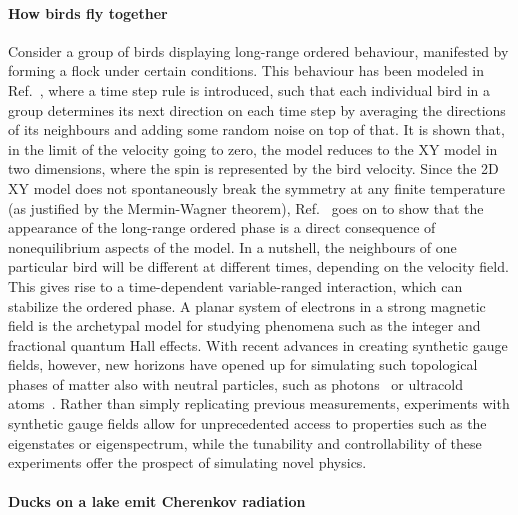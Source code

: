 \paragraph{How birds fly together}
Consider a group of birds displaying long-range ordered behaviour,
manifested by forming a flock under certain conditions. This behaviour
has been modeled in Ref.~\cite{Toner1995}, where a time step rule is
introduced, such that each individual bird in a group determines its
next direction on each time step by averaging the directions of its
neighbours and adding some random noise on top of that. It is shown
that, in the limit of the velocity going to zero, the model reduces to
the XY model in two dimensions, where the spin is represented by the
bird velocity. Since the 2D XY model does not spontaneously break the
symmetry at any finite temperature (as justified by the Mermin-Wagner
theorem), Ref.~\cite{Toner1995} goes on to show that the appearance of
the long-range ordered phase is a direct consequence of nonequilibrium
aspects of the model. In a nutshell, the neighbours of one particular
bird will be different at different times, depending on the velocity
field. This gives rise to a time-dependent variable-ranged
interaction, which can stabilize the ordered phase.
%
A planar system of electrons in a strong magnetic field is the
archetypal model for studying phenomena such as the integer and
fractional quantum Hall effects. With recent advances in creating
synthetic gauge fields, however, new horizons have opened up for
simulating such topological phases of matter also with neutral
particles, such as photons~\cite{hafezi2014synthetic} or ultracold
atoms~\cite{dalibardrmp2011, goldman_repprog_2014,
Goldman_arxiv_2015}.  Rather than simply replicating previous
measurements, experiments with synthetic gauge fields allow for
unprecedented access to properties such as the eigenstates or
eigenspectrum, while the tunability and controllability of these
experiments offer the prospect of simulating novel physics.


\paragraph{Ducks on a lake emit Cherenkov radiation}

